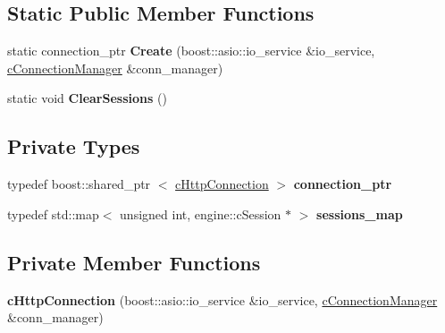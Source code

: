 \subsection*{\-Static \-Public \-Member \-Functions}
\begin{DoxyCompactItemize}
\item 
\hypertarget{classhttp__server_1_1cHttpConnection_a03b465f45c06bcc42c3a4e771ab00395}{
static connection\-\_\-ptr {\bfseries \-Create} (boost\-::asio\-::io\-\_\-service \&io\-\_\-service, \hyperlink{classhttp__server_1_1cConnectionManager}{c\-Connection\-Manager} \&conn\-\_\-manager)}
\label{classhttp__server_1_1cHttpConnection_a03b465f45c06bcc42c3a4e771ab00395}

\item 
\hypertarget{classhttp__server_1_1cHttpConnection_a233c74cfb8a64cfb93be34e2fca92741}{
static void {\bfseries \-Clear\-Sessions} ()}
\label{classhttp__server_1_1cHttpConnection_a233c74cfb8a64cfb93be34e2fca92741}

\end{DoxyCompactItemize}
\subsection*{\-Private \-Types}
\begin{DoxyCompactItemize}
\item 
\hypertarget{classhttp__server_1_1cHttpConnection_a0a5b09ba857189a7f7179096fdb15c09}{
typedef boost\-::shared\-\_\-ptr\*
$<$ \hyperlink{classhttp__server_1_1cHttpConnection}{c\-Http\-Connection} $>$ {\bfseries connection\-\_\-ptr}}
\label{classhttp__server_1_1cHttpConnection_a0a5b09ba857189a7f7179096fdb15c09}

\item 
\hypertarget{classhttp__server_1_1cHttpConnection_aef12353a1c35536062088868a1c47d16}{
typedef std\-::map$<$ unsigned int, \*
engine\-::c\-Session $\ast$ $>$ {\bfseries sessions\-\_\-map}}
\label{classhttp__server_1_1cHttpConnection_aef12353a1c35536062088868a1c47d16}

\end{DoxyCompactItemize}
\subsection*{\-Private \-Member \-Functions}
\begin{DoxyCompactItemize}
\item 
\hypertarget{classhttp__server_1_1cHttpConnection_a8b0305459f933592f64fab2e3289dd54}{
{\bfseries c\-Http\-Connection} (boost\-::asio\-::io\-\_\-service \&io\-\_\-service, \hyperlink{classhttp__server_1_1cConnectionManager}{c\-Connection\-Manager} \&conn\-\_\-manager)}
\label{classhttp__server_1_1cHttpConnection_a8b0305459f933592f64fab2e3289dd54}

\end{DoxyCompactItemize}
